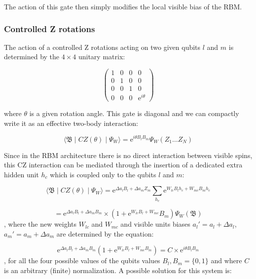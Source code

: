 The action of this gate then simply modifies the local visible bias of the RBM.

\subsubsection{Controlled Z rotations}
The action of a controlled Z rotations acting on two given qubits $l$ and $m$ is determined by
the $4\times4$ unitary matrix:

\begin{equation}
    \begin{pmatrix}
        1 & 0 & 0 & 0 \\
        0 & 1 & 0 & 0 \\
        0 & 0 & 1 & 0 \\
        0 & 0 & 0 & \mathrm{e}^{i\theta}
    \end{pmatrix}
\end{equation}

where $\theta$ is a given rotation angle. This gate is diagonal and we can compactly write it as an 
effective two-body interaction:

\begin{equation}
    \langle \mathfrak{B} \mid CZ(\theta) \mid \Psi_{W}  \rangle = 
    \mathrm{e}^{i\theta B_{l}B_{m}}\Psi_{W}(Z_{1} \dots Z_{N})
\end{equation}

Since in the RBM architecture there is no direct interaction between visible spins, this CZ interaction
can be mediated through the insertion of a dedicated extra hidden unit $h_{c}$ which is coupled only 
to the qubits $l$ and $m$: 

\begin{equation}
    \langle \mathfrak{B} \mid CZ(\theta) \mid \Psi_{W}  \rangle = 
    \mathrm{e}^{\Delta a_{l} B_{l} + \Delta a_{m} Z_{m}} \sum_{h_{c}}\mathrm{e}^{W_{lc} B_{l} h_{c} + W_{mc} B_{m} h_{c}}
\end{equation}

\begin{equation}
    = \mathrm{e}^{\Delta a_{l} B_{l} + \Delta a_{m} B_{m}} \times (1 + \mathrm{e}^{W_{lc} B_{l} + W_{mc}} B_{m}) \Psi_{W}(\mathfrak{B})
\end{equation}
, where the new weights $W_{lc}$ and $W_{mc}$ and visible units biases $a_{l}\prime= a_{l} + \Delta a_{l}$,
$a_{m}\prime= a_{m} + \Delta a_{m}$ are determined by the equation:

\begin{equation}
   \mathrm{e}^{\Delta a_{l} B_{l} + \Delta a_{m} B_{m}}(1 + \mathrm{e}^{W_{lc} B_{l} + W_{mc} B_{m}}) = C \times \mathrm{e}^{i \theta B_{l} B_{m}} 
\end{equation}
, for all the four possible values of the qubits values $B_{l}, B_{m} = \{0,1\}$ and where $C$ is an arbitrary (finite)
normalization. A possible solution for this system is:

